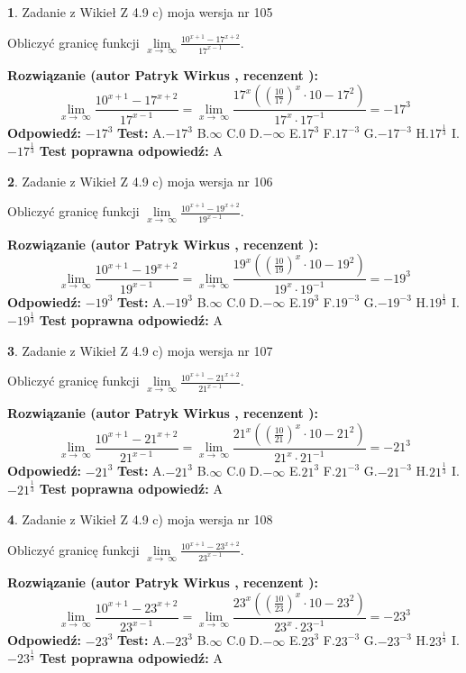 \documentclass[12pt, a4paper]{article}
\theoremstyle{definition} %
\newtheorem{zad}{}
\newcommand{\zadStart}[1]{\begin{zad}#1\newline}
\newcommand{\zadStop}{\end{zad}}
\newcommand{\rozwStart}[2]{\noindent \textbf{Rozwiązanie (autor #1 , recenzent #2): }\newline}
\newcommand{\rozwStop}{\newline}
\newcommand{\odpStart}{\noindent \textbf{Odpowiedź:}\newline}
\newcommand{\odpStop}{\newline}
\newcommand{\testStart}{\noindent \textbf{Test:}\newline}
\newcommand{\testStop}{\newline}
\newcommand{\kluczStart}{\noindent \textbf{Test poprawna odpowiedź:}\newline}
\newcommand{\kluczStop}{\newline}
\begin{document}
\zadStart{Zadanie z Wikieł Z 4.9 c) moja wersja nr 105}


Obliczyć granicę funkcji  $\lim\limits_{x\to\ \infty}\frac{10^{x+1}-17^{x+2}}{17^{x-1}}$.
\zadStop
\rozwStart{Patryk Wirkus}{}
$$\lim\limits_{x\to\ \infty}\frac{10^{x+1}-17^{x+2}}{17^{x-1}}=\lim\limits_{x\to\ \infty}\frac{17^{x}((\frac{10}{17})^{x}\cdot 10 -17^{2})}{17^{x}\cdot 17^{-1}} = -17^{3}$$
\rozwStop
\odpStart
$-17^{3}$
\odpStop
\testStart
A.$-17^{3}$ B.$\infty$ C.$0$ D.$-\infty$ E.$17^{3}$
F.$17^{-3}$ G.$-17^{-3}$
H.$17^{\frac{1}{3}}$
I.$-17^{\frac{1}{3}}$
\testStop
\kluczStart
A
\kluczStop



\zadStart{Zadanie z Wikieł Z 4.9 c) moja wersja nr 106}


Obliczyć granicę funkcji  $\lim\limits_{x\to\ \infty}\frac{10^{x+1}-19^{x+2}}{19^{x-1}}$.
\zadStop
\rozwStart{Patryk Wirkus}{}
$$\lim\limits_{x\to\ \infty}\frac{10^{x+1}-19^{x+2}}{19^{x-1}}=\lim\limits_{x\to\ \infty}\frac{19^{x}((\frac{10}{19})^{x}\cdot 10 -19^{2})}{19^{x}\cdot 19^{-1}} = -19^{3}$$
\rozwStop
\odpStart
$-19^{3}$
\odpStop
\testStart
A.$-19^{3}$ B.$\infty$ C.$0$ D.$-\infty$ E.$19^{3}$
F.$19^{-3}$ G.$-19^{-3}$
H.$19^{\frac{1}{3}}$
I.$-19^{\frac{1}{3}}$
\testStop
\kluczStart
A
\kluczStop



\zadStart{Zadanie z Wikieł Z 4.9 c) moja wersja nr 107}


Obliczyć granicę funkcji  $\lim\limits_{x\to\ \infty}\frac{10^{x+1}-21^{x+2}}{21^{x-1}}$.
\zadStop
\rozwStart{Patryk Wirkus}{}
$$\lim\limits_{x\to\ \infty}\frac{10^{x+1}-21^{x+2}}{21^{x-1}}=\lim\limits_{x\to\ \infty}\frac{21^{x}((\frac{10}{21})^{x}\cdot 10 -21^{2})}{21^{x}\cdot 21^{-1}} = -21^{3}$$
\rozwStop
\odpStart
$-21^{3}$
\odpStop
\testStart
A.$-21^{3}$ B.$\infty$ C.$0$ D.$-\infty$ E.$21^{3}$
F.$21^{-3}$ G.$-21^{-3}$
H.$21^{\frac{1}{3}}$
I.$-21^{\frac{1}{3}}$
\testStop
\kluczStart
A
\kluczStop



\zadStart{Zadanie z Wikieł Z 4.9 c) moja wersja nr 108}


Obliczyć granicę funkcji  $\lim\limits_{x\to\ \infty}\frac{10^{x+1}-23^{x+2}}{23^{x-1}}$.
\zadStop
\rozwStart{Patryk Wirkus}{}
$$\lim\limits_{x\to\ \infty}\frac{10^{x+1}-23^{x+2}}{23^{x-1}}=\lim\limits_{x\to\ \infty}\frac{23^{x}((\frac{10}{23})^{x}\cdot 10 -23^{2})}{23^{x}\cdot 23^{-1}} = -23^{3}$$
\rozwStop
\odpStart
$-23^{3}$
\odpStop
\testStart
A.$-23^{3}$ B.$\infty$ C.$0$ D.$-\infty$ E.$23^{3}$
F.$23^{-3}$ G.$-23^{-3}$
H.$23^{\frac{1}{3}}$
I.$-23^{\frac{1}{3}}$
\testStop
\kluczStart
A
\kluczStop
\end{document}
